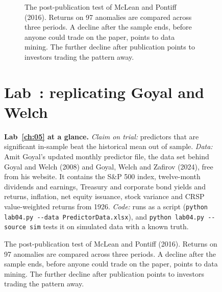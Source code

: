 \begin{figure}[htbp]
\begin{figure}[htbp]
  \caption{The post-publication test of McLean and Pontiff (2016). Returns on
    97 anomalies are compared across three periods. A decline after the sample
    ends, before anyone could trade on the paper, points to data mining. The
    further decline after publication points to investors trading the pattern
    away.}
  \label{fig:05-postpub}
\end{figure}

\section{Lab~\thechapter: replicating Goyal and Welch}
\label{sec:05-lab}

\begin{callout}
\textbf{Lab~\ref{ch:05} at a glance.} \emph{Claim on trial:} predictors that are significant in-sample beat the historical mean out of sample. \emph{Data:} Amit Goyal's updated monthly predictor file, the data set behind Goyal and Welch (2008) and Goyal, Welch and Zafirov (2024), free from his website. It contains the S\&P 500 index, twelve-month dividends and earnings, Treasury and corporate bond yields and returns, inflation, net equity issuance, stock variance and CRSP value-weighted returns from 1926. \emph{Code:} runs as a script (\texttt{python lab04.py -{}-data PredictorData.xlsx}), and \texttt{python lab04.py -{}-source sim} tests it on simulated data with a known truth.
\end{callout}


\end{figure}
